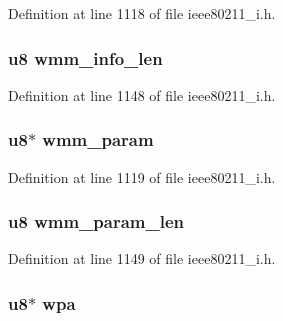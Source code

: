 Definition at line 1118 of file ieee80211\-\_\-i.\-h.

\hypertarget{structieee802__11__elems_abb89de16d0721b263ad0098cbb8edd51}{
\subsubsection[{wmm\-\_\-info\-\_\-len}]{\setlength{\rightskip}{0pt plus 5cm}u8 wmm\-\_\-info\-\_\-len}}\label{structieee802__11__elems_abb89de16d0721b263ad0098cbb8edd51}


Definition at line 1148 of file ieee80211\-\_\-i.\-h.

\hypertarget{structieee802__11__elems_a72ab3e59dc8571dab876636d8fb484f7}{
\subsubsection[{wmm\-\_\-param}]{\setlength{\rightskip}{0pt plus 5cm}u8$\ast$ wmm\-\_\-param}}\label{structieee802__11__elems_a72ab3e59dc8571dab876636d8fb484f7}


Definition at line 1119 of file ieee80211\-\_\-i.\-h.

\hypertarget{structieee802__11__elems_a8bd489ba83474d318aabdb2ca4ffb0e2}{
\subsubsection[{wmm\-\_\-param\-\_\-len}]{\setlength{\rightskip}{0pt plus 5cm}u8 wmm\-\_\-param\-\_\-len}}\label{structieee802__11__elems_a8bd489ba83474d318aabdb2ca4ffb0e2}


Definition at line 1149 of file ieee80211\-\_\-i.\-h.

\hypertarget{structieee802__11__elems_a4f433e136c9ee02a2dc8e9484078cd60}{
\subsubsection[{wpa}]{\setlength{\rightskip}{0pt plus 5cm}u8$\ast$ wpa}}\label{structieee802__11__elems_a4f433e136c9ee02a2dc8e9484078cd60}



